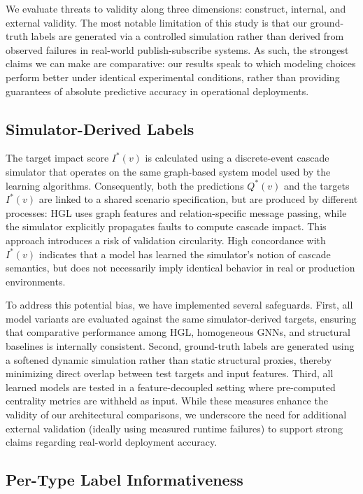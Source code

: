 \documentclass[sigconf,9pt,anonymous]{acmart}
\begin{document}
We evaluate threats to validity along three dimensions: construct, internal, and external validity. The most notable limitation of this study is that our ground-truth labels are generated via a controlled simulation rather than derived from observed failures in real-world publish-subscribe systems. As such, the strongest claims we can make are comparative: our results speak to which modeling choices perform better under identical experimental conditions, rather than providing guarantees of absolute predictive accuracy in operational deployments.

\subsection{Simulator-Derived Labels}

The target impact score $I^*(v)$ is calculated using a discrete-event cascade simulator that operates on the same graph-based system model used by the learning algorithms. Consequently, both the predictions $Q^*(v)$ and the targets $I^*(v)$ are linked to a shared scenario specification, but are produced by different processes: HGL uses graph features and relation-specific message passing, while the simulator explicitly propagates faults to compute cascade impact. This approach introduces a risk of validation circularity. High concordance with $I^*(v)$ indicates that a model has learned the simulator’s notion of cascade semantics, but does not necessarily imply identical behavior in real or production environments.



To address this potential bias, we have implemented several safeguards. First, all model variants are evaluated against the same simulator-derived targets, ensuring that comparative performance among HGL, homogeneous GNNs, and structural baselines is internally consistent. Second, ground-truth labels are generated using a softened dynamic simulation rather than static structural proxies, thereby minimizing direct overlap between test targets and input features. Third, all learned models are tested in a feature-decoupled setting where pre-computed centrality metrics are withheld as input. While these measures enhance the validity of our architectural comparisons, we underscore the need for additional external validation (ideally using measured runtime failures) to support strong claims regarding real-world deployment accuracy.

\subsection{Per-Type Label Informativeness}
\end{document}
